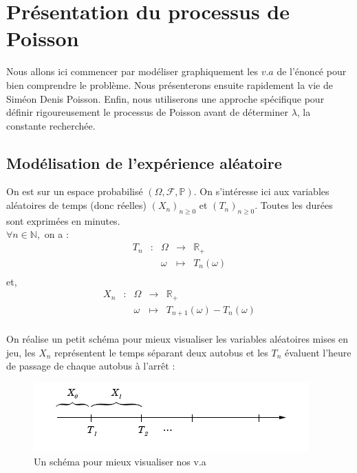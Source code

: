 \documentclass[a4paper, titlepage]{livret} %
\begin{document}
	\setcounter{tocdepth}{3} %
	\tableofcontents %
	
	\chapter{Présentation du processus de Poisson}
		Nous allons ici commencer par modéliser graphiquement les $v.a$ de l'énoncé pour bien comprendre le problème. 
		Nous présenterons ensuite rapidement la vie de Siméon Denis Poisson.
		Enfin, nous utiliserons une approche spécifique pour définir rigoureusement le processus de Poisson avant de déterminer $\lambda$, la constante recherchée.

		\section{Modélisation de l'expérience aléatoire}
			On est sur un espace probabilisé $(\Omega, \mathcal{F}, \mathbb{P})$.
			On s'intéresse ici aux variables aléatoires de temps (donc réelles) $(X_{n})_{n \geq 0}$ et $(T_{n})_{n \geq 0}$.
			Toutes les durées sont exprimées en minutes.\\
			$\forall n \in \mathbb{N},$ on a :
			\[\begin{array}{ccccc}
				T_{n} & : & \Omega & \to & \mathbb{R}_{+} \\
					  &   & \omega & \mapsto & T_{n}(\omega)\\
			\end{array}\]
			et,
			\[\begin{array}{ccccc}
				X_{n} & : & \Omega & \to & \mathbb{R}_{+} \\
					  &   & \omega & \mapsto & T_{n+1}(\omega) - T_{n}(\omega)\\
			\end{array}\]

			On réalise un petit schéma pour mieux visualiser les variables aléatoires mises en jeu, les $X_{n}$ représentent le temps séparant deux autobus et les $T_{n}$ évaluent l'heure de passage de chaque autobus à l'arrêt :
			\begin{figure}[!ht]
				\centering
  					\includegraphics[scale=0.6]{g0.png}
  					\caption{Un schéma pour mieux visualiser nos v.a}
			\end{figure}
\end{document}
